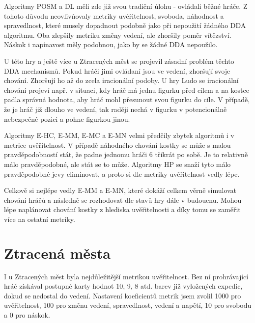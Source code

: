 Algoritmy POSM a DL měli zde již svou tradiční úlohu - ovládali běžné hráče. Z tohoto důvodu neovlivňovaly metriky uvěřitelnost, svoboda, náhodnost a spravedlnost, které musely dopadnout podobně jako při nepoužití žádného DDA algoritmu. Oba zlepšily metriku změny vedení, ale zhoršily poměr vítězství. Náskok i napínavost měly podobnou, jako by se žádné DDA nepoužilo. 

U této hry a ještě více u Ztracených měst se projevil zásadní problém těchto DDA mechanismů. Pokud hráči jimi ovládaní jsou ve vedení, zhoršují svoje chování. Zhoršují ho až do zcela iracionální podoby. U hry Ludo se iracionální chování projeví např. v situaci, kdy hráč má jednu figurku před cílem a na kostce padla správná hodnota, aby hráč mohl přesunout svou figurku do cíle. V případě, že je hráč již dlouho ve vedení, tak raději nechá v figurku v potencionálně nebezpečné pozici a pohne figurkou jinou. 

Algoritmy E-HC, E-MM, E-MC a E-MN velmi předčily zbytek algoritmů i v metrice uvěřitelnost. V případě náhodného chování kostky se může s malou pravděpodobností stát, že padne jednomu hráči 6 třikrát po sobě. Je to relativně málo pravděpodobné, ale stát se to může. Algoritmy HP se snaží tyto málo pravděpodobné jevy eliminovat, a proto si dle metriky uvěřitelnost vedly lépe.

Celkově si nejlépe vedly E-MM a E-MN, které dokáží celkem věrně simulovat chování hráčů a následně se rozhodovat dle stavů hry dále v budoucnu. Mohou lépe naplánovat chování kostky z hlediska uvěřitelnosti a díky tomu se zaměřit více na ostatní metriky.

\section{Ztracená města}

I u Ztracených měst byla nejdůležitější metrikou uvěřitelnost. Bez ní prohrávající hráč získával postupně karty hodnot 10, 9, 8 atd. barev již vyložených expedic, dokud se nedostal do vedení. Nastavení koeficientů metrik jsem zvolil 1000 pro uvěřitelnost, 100 pro změnu vedení, spravedlnost, vedení a napětí, 10 pro svobodu a 0 pro náskok.

